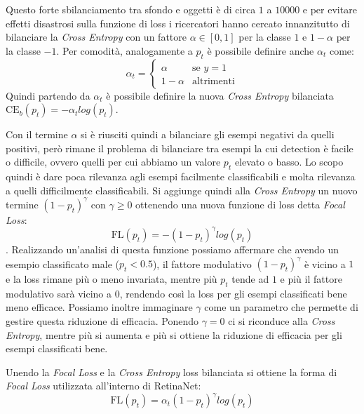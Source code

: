 Questo forte sbilanciamento tra sfondo e oggetti è di circa $1$ a $10000$ e per evitare effetti disastrosi sulla funzione di loss i ricercatori hanno cercato innanzitutto di bilanciare la \textit{Cross Entropy} con un fattore $\alpha \in [0, 1]$ per la classe $1$ e $1 - \alpha$ per la classe $-1$. Per comodità, analogamente a $p_t$ è possibile definire anche $\alpha_t$ come:
$$\alpha_t = \begin{cases} \alpha &\text{se $y = 1$} \\ 1 - \alpha &\text{altrimenti}\end{cases}$$ 
Quindi partendo da $\alpha_t$ è possibile definire la nuova \textit{Cross Entropy} bilanciata $\textrm{CE}_b(p_t)=-\alpha_t log(p_t)$. 

Con il termine $\alpha$ si è riusciti quindi a bilanciare gli esempi negativi da quelli positivi, però rimane il problema di bilanciare tra esempi la cui detection è facile o difficile, ovvero quelli per cui abbiamo un valore $p_t$ elevato o basso. Lo scopo quindi è dare poca rilevanza agli esempi facilmente classificabili e molta rilevanza a quelli difficilmente classificabili. Si aggiunge quindi alla \textit{Cross Entropy} un nuovo termine $(1-p_t)^\gamma$ con $\gamma \geq 0$ ottenendo una nuova funzione di loss detta \textit{Focal Loss}:
$$\textrm{FL}(p_t) = -(1-p_t)^\gamma log(p_t)$$.
Realizzando un'analisi di questa funzione possiamo affermare che avendo un esempio classificato male ($p_t < 0.5$), il fattore modulativo $(1-p_t)^\gamma$ è vicino a $1$ e la loss rimane più o meno invariata, mentre più $p_t$ tende ad $1$ e più il fattore modulativo sarà vicino a $0$, rendendo così la loss per gli esempi classificati bene meno efficace.
Possiamo inoltre immaginare $\gamma$ come un parametro che permette di gestire questa riduzione di efficacia. Ponendo $\gamma = 0$ ci si riconduce alla \textit{Cross Entropy}, mentre più si aumenta e più si ottiene la riduzione di efficacia per gli esempi classificati bene. 

Unendo la \textit{Focal Loss} e la \textit{Cross Entropy} loss bilanciata si ottiene la forma di \textit{Focal Loss} utilizzata all'interno di RetinaNet:
$$\textrm{FL}(p_t) = \alpha_t(1-p_t)^\gamma log(p_t)$$

